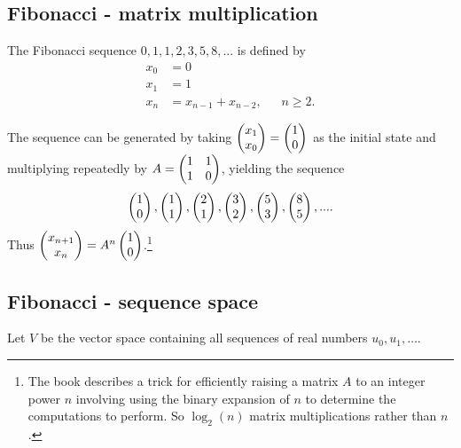 \subsection{Fibonacci - matrix multiplication}\label{fibonacci-matrix-multiplication}

\begin{definition*}
  The Fibonacci sequence $0, 1, 1, 2, 3, 5, 8, ...$ is defined by
  \begin{align*}
    x_0 &= 0\\
    x_1 &= 1\\
    x_{n} &= x_{n-1} + x_{n-2}, ~~~~~~~ n \geq 2.
  \end{align*}
\end{definition*}

\begin{remark*}
  The sequence can be generated by taking $\begin{pmatrix}x_1\\x_0\end{pmatrix} = \begin{pmatrix}1\\0\end{pmatrix}$ as the initial state and multiplying
  repeatedly by $A = \begin{pmatrix}1 & 1\\1 & 0\\ \end{pmatrix}$, yielding the sequence
  \begin{align*}
    \begin{pmatrix}1\\0\end{pmatrix}, \begin{pmatrix}1\\1\end{pmatrix}, \begin{pmatrix}2\\1\end{pmatrix}, \begin{pmatrix}3\\2\end{pmatrix}, \begin{pmatrix}5\\3\end{pmatrix}, \begin{pmatrix}8\\5\end{pmatrix}, ....
  \end{align*}
  Thus $\begin{pmatrix}x_{n+1}\\x_n\end{pmatrix} = A^n\begin{pmatrix}1\\0\end{pmatrix}$.\footnote{The book describes a trick for
    efficiently raising a matrix $A$ to an integer power $n$ involving using the binary expansion
    of $n$ to determine the computations to perform. So $\log_2(n)$ matrix multiplications rather
    than $n$.}
\end{remark*}

\newpage
\subsection{Fibonacci - sequence space}

Let $V$ be the vector space containing all sequences of real numbers
$u_0, u_1, \ldots$.

\begin{comment}
  \begin{proof}
    This is a vector space since:
    \begin{enumerate}
    \item It's an Abelian group under addition (the zero sequence is the additive identity, inverse
      is obtained by negating each element, addition is associative and commutative)
    \item Closed under scalar multiplication since $\lambda u_0, \lambda u_1, ... \in V$.
    \end{enumerate}
  \end{proof}
\end{comment}

